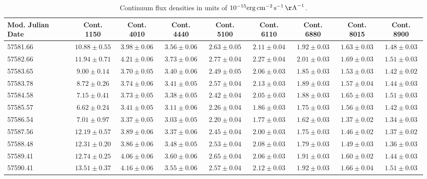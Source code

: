 \begin{table}
	\centering
	\caption[Continuum flux densities]{Continuum flux densities in units of $10^{-15}\mathrm{erg}\,\mathrm{cm}^{-2}\,\mathrm{s}^{-1}\,\mathrm{\AA}^{-1}$.}
	\begin{tabular}{lcccccccc}
		\hline\hline
		Mod. Julian Date & Cont. 1150 & Cont. 4010 & Cont. 4440 & Cont. 5100 & Cont. 6110 & Cont. 6880 & Cont. 8015 & Cont. 8900 \\
		\hline
		57581.66 & $10.88 \pm 0.55$ & $3.98 \pm 0.06$ & $3.56 \pm 0.06$ & $2.63 \pm 0.05$ & $2.11 \pm 0.04$ & $1.92 \pm 0.03$ & $1.63 \pm 0.03$ & $1.48 \pm 0.03$ \\
		57582.66 & $11.94 \pm 0.71$ & $4.21 \pm 0.06$ & $3.73 \pm 0.06$ & $2.77 \pm 0.04$ & $2.27 \pm 0.04$ & $2.01 \pm 0.03$ & $1.69 \pm 0.03$ & $1.51 \pm 0.03$ \\
		57583.65 & $9.00 \pm 0.14$ & $3.70 \pm 0.05$ & $3.40 \pm 0.06$ & $2.49 \pm 0.05$ & $2.06 \pm 0.03$ & $1.85 \pm 0.03$ & $1.53 \pm 0.03$ & $1.42 \pm 0.02$ \\
		57583.78 & $8.72 \pm 0.26$ & $3.74 \pm 0.06$ & $3.41 \pm 0.05$ & $2.57 \pm 0.04$ & $2.13 \pm 0.03$ & $1.89 \pm 0.03$ & $1.57 \pm 0.04$ & $1.44 \pm 0.03$ \\
		57584.58 & $7.15 \pm 0.41$ & $3.73 \pm 0.05$ & $3.38 \pm 0.05$ & $2.42 \pm 0.04$ & $2.05 \pm 0.03$ & $1.88 \pm 0.03$ & $1.65 \pm 0.03$ & $1.51 \pm 0.03$ \\
		57585.57 & $6.62 \pm 0.24$ & $3.41 \pm 0.05$ & $3.11 \pm 0.06$ & $2.26 \pm 0.04$ & $1.86 \pm 0.03$ & $1.75 \pm 0.03$ & $1.56 \pm 0.03$ & $1.42 \pm 0.03$ \\
		57586.54 & $7.01 \pm 0.97$ & $3.37 \pm 0.05$ & $3.03 \pm 0.05$ & $2.20 \pm 0.04$ & $1.77 \pm 0.03$ & $1.62 \pm 0.03$ & $1.37 \pm 0.02$ & $1.34 \pm 0.03$ \\
		57587.56 & $12.19 \pm 0.57$ & $3.89 \pm 0.06$ & $3.37 \pm 0.06$ & $2.45 \pm 0.04$ & $2.00 \pm 0.03$ & $1.75 \pm 0.03$ & $1.46 \pm 0.02$ & $1.37 \pm 0.02$ \\
		57588.48 & $12.31 \pm 0.20$ & $3.86 \pm 0.06$ & $3.48 \pm 0.05$ & $2.53 \pm 0.04$ & $2.08 \pm 0.03$ & $1.79 \pm 0.03$ & $1.49 \pm 0.03$ & $1.36 \pm 0.03$ \\
		57589.41 & $12.74 \pm 0.25$ & $4.06 \pm 0.06$ & $3.60 \pm 0.06$ & $2.65 \pm 0.04$ & $2.06 \pm 0.03$ & $1.91 \pm 0.03$ & $1.60 \pm 0.02$ & $1.44 \pm 0.03$ \\
		57590.41 & $13.51 \pm 0.37$ & $4.16 \pm 0.06$ & $3.55 \pm 0.06$ & $2.57 \pm 0.04$ & $2.12 \pm 0.03$ & $1.92 \pm 0.03$ & $1.66 \pm 0.04$ & $1.51 \pm 0.03$ \\

\end{tabular}
\end{table}
